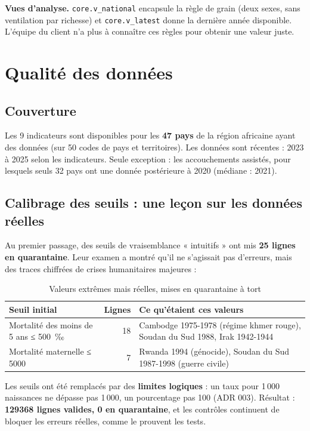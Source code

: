 \documentclass[11pt, a4paper, oneside, headings=normal, numbers=noenddot, DIV=12]{scrartcl}
\begin{document}
\textbf{Vues d'analyse.} \texttt{core.v\_national} encapsule la règle de grain (deux sexes, sans ventilation par richesse) et
\texttt{core.v\_latest} donne la dernière année disponible. L'équipe du client n'a plus à connaître ces règles pour obtenir une valeur juste.

\section{Qualité des données}

\subsection{Couverture}
Les 9 indicateurs sont disponibles pour les \textbf{47 pays} de la région africaine ayant des données (sur 50 codes de pays et territoires).
Les données sont récentes : 2023 à 2025 selon les indicateurs. Seule exception : les accouchements assistés, pour lesquels seuls 32 pays ont
une donnée postérieure à 2020 (médiane : 2021).

\subsection{Calibrage des seuils : une leçon sur les données réelles}
Au premier passage, des seuils de vraisemblance « intuitifs » ont mis \textbf{25 lignes en quarantaine}. Leur examen a montré qu'il ne s'agissait
pas d'erreurs, mais des traces chiffrées de crises humanitaires majeures :

\begin{table}[H]
\centering\small
\begin{tabularx}{\linewidth}{@{}L{4.6cm} r Y@{}}
\toprule
\textbf{Seuil initial} & \textbf{Lignes} & \textbf{Ce qu'étaient ces valeurs} \\
\midrule
Mortalité des moins de 5 ans ≤ 500~‰ & 18 & Cambodge 1975-1978 (régime khmer rouge), Soudan du Sud 1988, Irak 1942-1944 \\
Mortalité maternelle ≤ \num{5000} & 7 & Rwanda 1994 (génocide), Soudan du Sud 1987-1998 (guerre civile) \\
\bottomrule
\end{tabularx}
\caption{Valeurs extrêmes mais réelles, mises en quarantaine à tort}
\end{table}

Les seuils ont été remplacés par des \textbf{limites logiques} : un taux pour 1\,000 naissances ne dépasse pas 1\,000, un pourcentage pas 100
(ADR 003). Résultat : \textbf{\num{129368} lignes valides, 0 en quarantaine}, et les contrôles continuent de bloquer les erreurs réelles,
comme le prouvent les tests.
\end{document}
